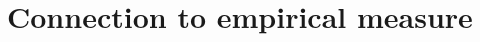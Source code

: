 \documentclass{article}
\begin{document}











\section{Connection to empirical measure}
\end{document}
